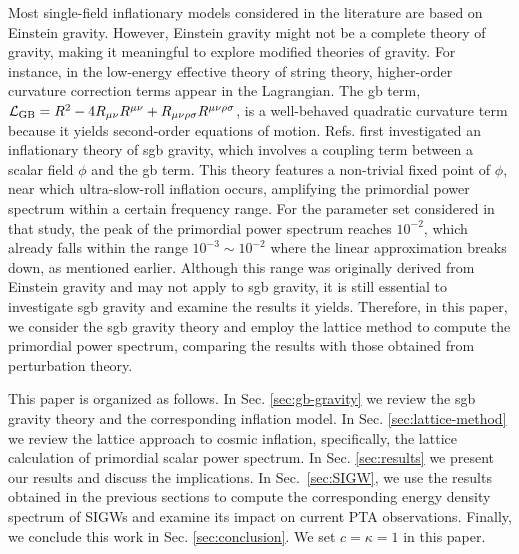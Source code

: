 \documentclass[reprint, 10pt, amsmath, amssymb, floatfix, aps, prd, superscriptaddress, nofootinbib, nobibnotes,twocolumn]{revtex4-1}
\begin{document}
Most single-field inflationary models considered in the literature are based on Einstein gravity. However, Einstein gravity might not be a complete theory of gravity, making it meaningful to explore modified theories of gravity. For instance, in the low-energy effective theory of string theory, higher-order curvature correction terms appear in the Lagrangian. The \ac{gb} term, ${\mathcal L}_{\rm GB} = R^2 - 4 R_{\mu\nu}R^{\mu\nu} + R_{\mu\nu\rho\sigma}R^{\mu\nu\rho\sigma}$, is a well-behaved quadratic curvature term because it yields second-order equations of motion. Refs.\cite{Kawai:2021bye,Kawai:2021edk} first investigated an inflationary theory of \ac{sgb} gravity, which involves a coupling term between a scalar field $\phi$ and the \ac{gb} term. This theory features a non-trivial fixed point of $\phi$, near which ultra-slow-roll inflation occurs, amplifying the primordial power spectrum within a certain frequency range. For the parameter set considered in that study, the peak of the primordial power spectrum reaches $10^{-2}$, which already falls within the range $10^{-3} \sim 10^{-2}$ where the linear approximation breaks down, as mentioned earlier. Although this range was originally derived from Einstein gravity and may not apply to \ac{sgb} gravity, it is still essential to investigate \ac{sgb} gravity and examine the results it yields. Therefore, in this paper, we consider the \ac{sgb} gravity theory and employ the lattice method to compute the primordial power spectrum, comparing the results with those obtained from perturbation theory.

This paper is organized as follows. In Sec. \ref{sec:gb-gravity} we review the \ac{sgb} gravity theory and the corresponding inflation model. In Sec. \ref{sec:lattice-method} we review the lattice approach to cosmic inflation, specifically, the lattice calculation of primordial scalar power spectrum. In Sec. \ref{sec:results} we present our results and discuss the implications. In Sec.~\ref{sec:SIGW}, we use the results obtained in the previous sections to compute the corresponding  energy density spectrum of \acp{SIGW} and examine its impact on current \ac{PTA} observations.  Finally, we conclude this work in Sec. \ref{sec:conclusion}. We set $c = \kappa = 1$ in this paper.
\end{document}
